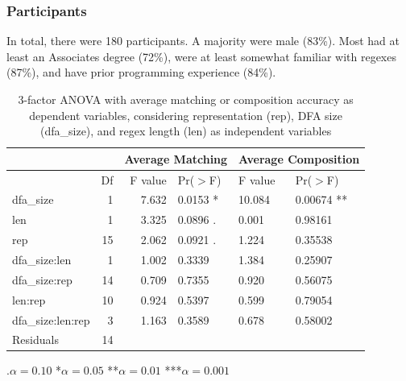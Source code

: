 \subsubsection{Participants}

In total, there were 180 participants.
A majority were male (83\%). %
Most had
at least an Associates degree (72\%), were at least somewhat familiar with regexes (87\%), and have prior programming experience (84\%).





\begin{table}[t]
\centering
\caption{3-factor ANOVA with average matching or composition accuracy as dependent variables, considering representation (rep), DFA size (dfa\_size), and regex length (len) as independent variables}
\begin{tabular}{@{}l@{}r|rl|ll@{}}

  \multicolumn{2}{c}{} & \multicolumn{2}{c}{Average Matching} & \multicolumn{2}{c}{Average Composition} \\
    \hline
 & Df & F value & Pr($>$F) & F value & Pr($>$F) \\
  \hline
dfa\_size &              1 &  7.632 &0.0153 * & 10.084 &0.00674 ** \\
len      &          1 &  3.325 &0.0896 . &  0.001 &0.98161 \\
rep            &      15 &  2.062 &0.0921 . & 1.224 &0.35538\\
dfa\_size:len  &     1 & 1.002 &0.3339  & 1.384 &0.25907   \\
dfa\_size:rep    &     14 & 0.709 &0.7355 &0.920& 0.56075   \\
len:rep     &     10 & 0.924& 0.5397  &  0.599& 0.79054   \\
dfa\_size:len:rep  &3&  1.163& 0.3589 & 0.678 &0.58002   \\
Residuals        &     14&&&&\\
   \hline
\end{tabular}

\vspace{3pt}
.$\alpha = 0.10$ \hspace{3pt} *$\alpha=0.05$ \hspace{3pt} **$\alpha=0.01$ \hspace{3pt} ***$\alpha=0.001$
\label{table:anova}
\end{table}


